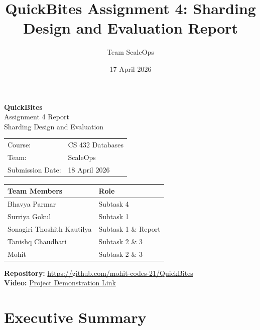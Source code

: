 \documentclass[12pt,a4paper]{article}
\title{QuickBites Assignment 4: Sharding Design and Evaluation Report}
\author{Team ScaleOps}
\date{17 April 2026}
\begin{document}
\begin{titlepage}
\centering
\vspace*{1.8cm}
{\fontsize{22}{26}\selectfont \textbf{QuickBites}}\\[0.4cm]
{\Large Assignment 4 Report}\\[0.2cm]
{\large Sharding Design and Evaluation}\\[1.6cm]

\begin{tabular}{ll}
Course: & CS 432 Databases \\
Team: & ScaleOps \\
Submission Date: & 18 April 2026 \\
\end{tabular}

\vspace{1.4cm}

\begin{minipage}{0.84\textwidth}
  \centering
  \begin{tabular}{@{} L{5.0cm} L{7.0cm} @{}}
  \toprule
  \textbf{Team Members} & \textbf{Role} \\
  \midrule
  Bhavya Parmar & Subtask 4\\
  Surriya Gokul &  Subtask 1\\
  Sonagiri Thoshith Kautilya &  Subtask 1 \& Report\\
  Tanishq Chaudhari & Subtask 2 \& 3\\
  Mohit & Subtask 2 \& 3\\
  \bottomrule
  \end{tabular}
  \end{minipage}

\vspace{1.4cm}

\begin{minipage}{0.9\textwidth}
\textbf{Repository:} \href{https://github.com/mohit-codes-21/QuickBites}{https://github.com/mohit-codes-21/QuickBites}\\
\textbf{Video:} \href{https://drive.google.com/file/d/1e2TOupRxlVEyKsvpMLmblW_UvzhAfaY6/view?usp=sharing}{Project Demonstration Link}
\end{minipage}

\vfill
\end{titlepage}

\tableofcontents
\newpage

\section{Executive Summary}
\end{document}
